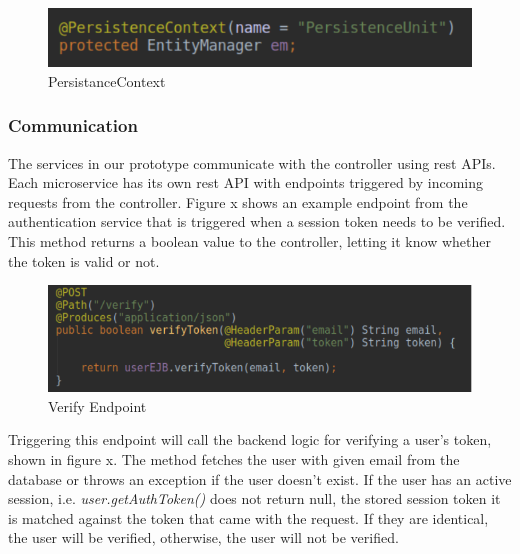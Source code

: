 \begin{figure}[ht]
  \centering
  \includegraphics[scale=0.9]{figs/persistencecontext.png}
  \caption{PersistanceContext}
  \label{fig:databaseconfig}
\end{figure}

\newpage

\subsubsection{Communication}
The services in our prototype communicate with the controller using rest APIs. Each microservice has its own rest API with endpoints triggered by incoming requests from the controller. Figure x shows an example endpoint from the authentication service that is triggered when a session token needs to be verified. This method returns a boolean value to the controller, letting it know whether the token is valid or not. \\

\begin{figure}[ht]
  \centering
  \includegraphics[scale=0.9]{figs/verifyendpoint.png}
  \caption{Verify Endpoint}
  \label{fig:databaseconfig}
\end{figure}

\noindent Triggering this endpoint will call the backend logic for verifying a user’s token, shown in figure x. The method fetches the user with given email from the database or throws an exception if the user doesn’t exist. If the user has an active session, i.e. \textit{user.getAuthToken()} does not return null, the stored session token it is matched against the token that came with the request. If they are identical, the user will be verified, otherwise, the user will not be verified.  


